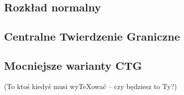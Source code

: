 {

\makeatletter
{}
\makeatother
\graphicspath{{../probabil}}

\let\realsection\section
\let\realsubsection\subsection
\let\section\subsection
\let\subsection\subsubsection
\let\subsubsection\paragraph

\realsubsection{Rozkład normalny}


\realsubsection{Centralne Twierdzenie Graniczne}


\realsubsection{Mocniejsze warianty CTG}
(To ktoś kiedyś musi wyTeXować -- czy będziesz to Ty?)
}



